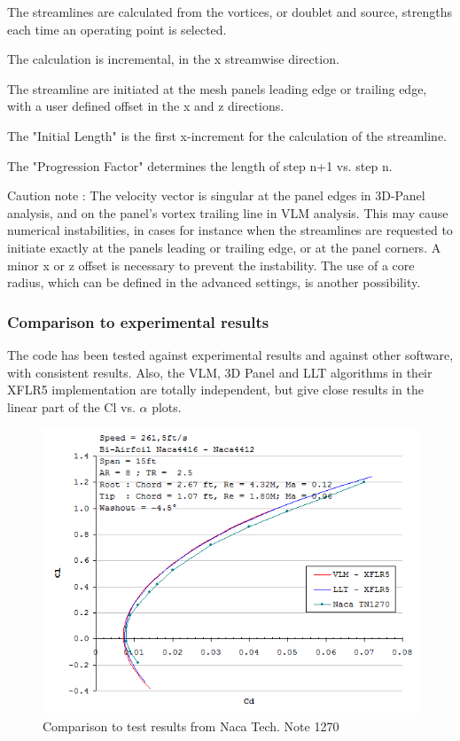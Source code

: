 \documentclass[a4paper,twoside,12pt,dvips]{article}
\begin{document}
The streamlines are calculated from the vortices, or doublet and
source, strengths each time an operating point is selected.

The calculation is incremental, in the x streamwise direction.

The streamline are initiated at the mesh panels leading edge or
trailing edge, with a user defined offset in the x and z directions.

The "Initial Length" is the first x-increment for the calculation of
the streamline.

The "Progression Factor" determines the length of step n+1 vs. step
n.

Caution note : The velocity vector is singular at the panel edges in
3D-Panel analysis, and on the panel's vortex trailing line in VLM
analysis. This may cause numerical instabilities, in cases for
instance when the streamlines are requested to initiate exactly at the
panels leading or trailing edge, or at the panel corners. A minor x or
z offset is necessary to prevent the instability. The use of a core
radius, which can be defined in the advanced settings, is another
possibility.

\subsubsection{Comparison to experimental results}

The code has been tested against experimental results and against
other software, with consistent results.\newline
Also, the VLM, 3D Panel and LLT algorithms in their XFLR5 implementation
are totally independent, but give close results in the linear part of
the Cl vs. $\alpha$ plots.

\begin{figure}[htbp]
  \includegraphics[width=0.8\linewidth]{img-36}\centering 
  \caption{Comparison to test results from Naca Tech. Note 1270}
  \label{fig:comparison_to_test_results}
\end{figure}
\end{document}
